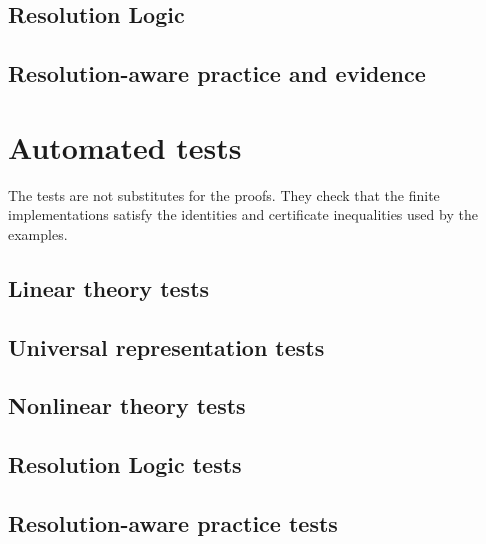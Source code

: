 \documentclass[11pt]{article}
\theoremstyle{definition}
\theoremstyle{remark}
\begin{document}
\clearpage
\subsection{Resolution Logic}

\clearpage
\subsection{Resolution-aware practice and evidence}



\clearpage
\section{Automated tests}
\label{sec:resolution-tests}

The tests are not substitutes for the proofs.  They check that the finite implementations satisfy the identities and certificate inequalities used by the examples.

\subsection{Linear theory tests}


\clearpage
\subsection{Universal representation tests}


\clearpage
\subsection{Nonlinear theory tests}


\clearpage
\subsection{Resolution Logic tests}


\clearpage
\subsection{Resolution-aware practice tests}

\end{document}
